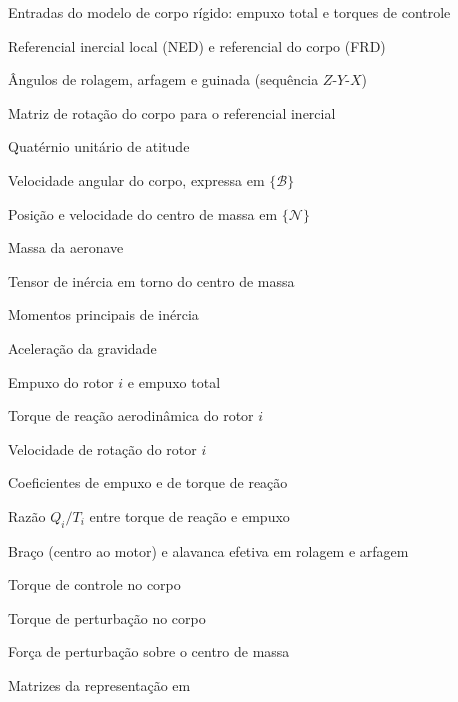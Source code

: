 \begin{simbolos}
    \item[$\vetor{u} = {[T\ \tau_x\ \tau_y\ \tau_z]}^{\mathsf{T}}$] Entradas do
        modelo de corpo rígido: empuxo total e torques de controle
    \item[$\{\mathcal{N}\}$, $\{\mathcal{B}\}$] Referencial inercial local (NED)
        e referencial do corpo (FRD)
    \item[$\phi, \theta, \psi$] Ângulos de rolagem, arfagem e guinada
        (sequência $Z$-$Y$-$X$)
    \item[$\matriz{R}$] Matriz de rotação do corpo para o referencial inercial
    \item[$\vetor{q}$] Quatérnio unitário de atitude
    \item[$\vetor{\omega} = {[p\ q\ r]}^{\mathsf{T}}$] Velocidade angular do
        corpo, expressa em $\{\mathcal{B}\}$
    \item[$\vetor{p}, \vetor{v}$] Posição e velocidade do centro de massa em
        $\{\mathcal{N}\}$
    \item[$m$] Massa da aeronave
    \item[$\matriz{J}$] Tensor de inércia em torno do centro de massa
    \item[$J_{xx}, J_{yy}, J_{zz}$] Momentos principais de inércia
    \item[$g$] Aceleração da gravidade
    \item[$T_i$, $T$] Empuxo do rotor $i$ e empuxo total
    \item[$Q_i$] Torque de reação aerodinâmica do rotor $i$
    \item[$\Omega_i$] Velocidade de rotação do rotor $i$
    \item[$k_T, k_Q$] Coeficientes de empuxo e de torque de reação
    \item[$\kappa$] Razão $Q_i/T_i$ entre torque de reação e empuxo
    \item[$\ell$, $\ell_{xy}$] Braço (centro ao motor) e alavanca efetiva em
        rolagem e arfagem
    \item[$\vetor{\tau}$] Torque de controle no corpo
    \item[$\vetor{\tau}_d$] Torque de perturbação no corpo
    \item[$\vetor{f}_d$] Força de perturbação sobre o centro de massa
    \item[$\matriz{A}, \matriz{B}, \matriz{C}$] Matrizes da representação em

\end{simbolos}
